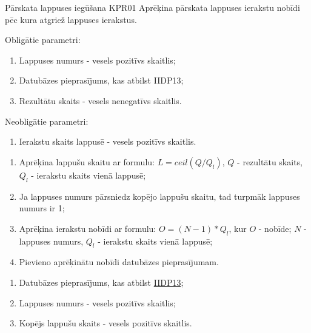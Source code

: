 \procedureTable
{Pārskata lappuses iegūšana}
{KPR01}
{
	Aprēķina pārskata lappuses ierakstu nobīdi pēc kura atgriež lappuses ierakstus.
}
{
	Obligātie parametri:
	\begin{enumerate}
		\item Lappuses numurs - vesels pozitīvs skaitlis;
		\item Datubāzes pieprasījums, kas atbilst IIDP13;
		\item Rezultātu skaits - vesels nenegatīvs skaitlis.
	\end{enumerate}

	Neobligātie parametri:
	\begin{enumerate}
		\item Ierakstu skaits lappusē - vesels pozitīvs skaitlis.
	\end{enumerate}
}
{
	\begin{enumerate}
		\item Aprēķina lappušu skaitu ar formulu: $L = ceil(Q / Q_l)$, $Q$ - rezultātu skaits, $Q_l$ - ierakstu skaits vienā lappusē;
		\item Ja lappuses numurs pārsniedz kopējo lappušu skaitu, tad turpmāk lappuses numurs ir 1;
		\item Aprēķina ierakstu nobīdi ar formulu: $O = (N - 1) * Q_l$, kur $O$ - nobīde; $N$ - lappuses numurs, $Q_l$ - ierakstu skaits vienā lappusē;
		\item Pievieno aprēķinātu nobīdi datubāzes pieprasījumam.
	\end{enumerate}
}
{
	\begin{enumerate}
		\item Datubāzes pieprasījums, kas atbilst \hyperref[tab:IIDP13]{IIDP13};
		\item Lappuses numurs - vesels pozitīvs skaitlis;
		\item Kopējs lappušu skaits - vesels pozitīvs skaitlis.
	\end{enumerate}
}
